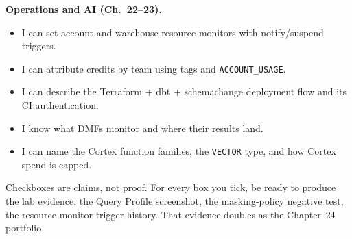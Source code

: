 \textbf{Operations and AI (Ch.~22--23).}
\begin{itemize}
    \item[$\square$] I can set account and warehouse resource monitors with notify/suspend triggers.
    \item[$\square$] I can attribute credits by team using tags and \texttt{ACCOUNT\_USAGE}.
    \item[$\square$] I can describe the Terraform + dbt + schemachange deployment flow and its CI authentication.
    \item[$\square$] I know what DMFs monitor and where their results land.
    \item[$\square$] I can name the Cortex function families, the \texttt{VECTOR} type, and how Cortex spend is capped.
\end{itemize}

\begin{notebox}
Checkboxes are claims, not proof. For every box you tick, be ready to produce the lab evidence:
the Query Profile screenshot, the masking-policy negative test, the resource-monitor trigger
history. That evidence doubles as the Chapter~24 portfolio.
\end{notebox}
